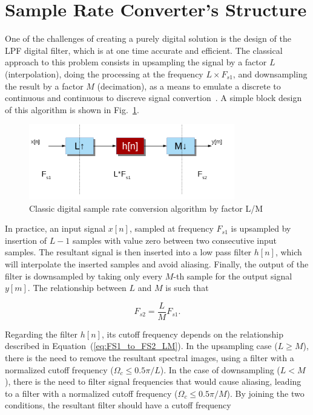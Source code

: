 \section{Sample Rate Converter's Structure}
\label{section:asrc_structure}

One of the challenges of creating a purely digital solution is the design of the
LPF digital filter, which is at one time accurate and efficient.  The classical
approach to this problem consists in upsampling the signal by a factor $L$
(interpolation), doing the processing at the frequency $L \times F_{s1}$, and
downsampling the result by a factor $M$ (decimation), as a means to emulate a
discrete to continuous and continuous to discreve signal convertion~\cite{Mitra:HDSP}.
A simple block design of this algorithm is shown in Fig.~\ref{fig:classic_digital}.

\begin{figure}[!htb]
  \centering
  \includegraphics[width=0.8\textwidth]{Figures/classic_digital_alg.png}
  \caption{Classic digital sample rate conversion algorithm by factor L/M}
  \label{fig:classic_digital}
\end{figure}

In practice, an input signal $x[n]$, sampled at frequency $F_{s1}$ is upsampled
by insertion of $L-1$ samples with value zero between two consecutive input samples.
The resultant signal is then inserted into a low pass filter $h[n]$, which will
interpolate the inserted samples and avoid aliasing. Finally, the output of the
filter is downsampled by taking only every $M$-th sample for the output signal
$y[m]$. The relationship between $L$ and $M$ is such that

\begin{equation}
  F_{s2} = \frac{L}{M} F_{s1} .
  \label{eq:FS1_to_FS2_LM}
\end{equation}

Regarding the filter $h[n]$, its cutoff frequency depends on the relationship
described in Equation~(\ref{eq:FS1_to_FS2_LM}).  In the upsampling case ($L \geq
M$), there is the need to remove the resultant spectral images, using a filter
with a normalized cutoff frequency ($\Omega_c \leq 0.5\pi/L$). In the case of
downsampling ($L < M$), there is the need to filter signal frequencies that
would cause aliasing, leading to a filter with a normalized cutoff frequency
($\Omega_c \leq 0.5\pi/M$).  By joining the two conditions, the resultant filter
should have a cutoff frequency

